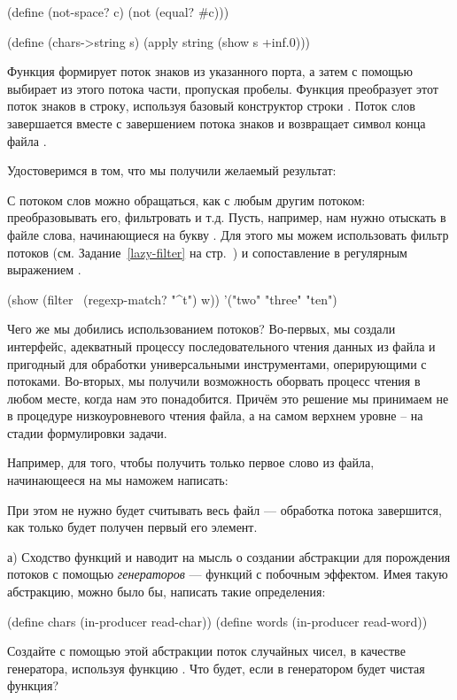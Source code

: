 {\begin{Definition}[emph={p,ch,s,c}]
(define (not-space? c) (not (equal? #\space c)))

(define (chars->string s) 
  (apply string (show s +inf.0)))
\end{Definition}
\noindent
Функция  формирует поток знаков из указанного порта, а затем с помощью  выбирает из этого потока части, пропуская пробелы. Функция  преобразует этот поток знаков в строку, используя базовый конструктор строки . Поток слов завершается вместе с завершением потока знаков и возвращает символ конца файла .

Удостоверимся в том, что мы получили желаемый результат:

С потоком слов можно обращаться, как с любым другим потоком: преобразовывать его, фильтровать и т.д. Пусть, например, нам нужно отыскать в файле слова, начинающиеся на букву . Для этого мы можем использовать фильтр потоков  (см. Задание~\ref{lazy-filter} на стр.~\pageref{lazy-filter}) и сопоставление в регулярным выражением .

\REPL
 {(show (filter~ (regexp-match? "^t") w))}
 {'("two" "three" "ten")}

Чего же мы добились использованием потоков? Во-первых, мы создали интерфейс, адекватный процессу последовательного чтения данных из файла и пригодный для обработки универсальными инструментами, оперирующими с потоками.
Во-вторых, мы получили возможность оборвать процесс чтения в любом месте, когда нам это понадобится. Причём это решение мы принимаем не в процедуре низкоуровневого чтения файла, а на самом верхнем уровне – на стадии формулировки задачи. 

Например, для того, чтобы получить только первое слово из файла, начинающееся на  мы наможем написать:

\noindent
При этом не нужно будет считывать весь файл --- обработка потока завершится, как только будет получен первый его элемент.

\begin{Assignment}
а) Сходство функций  и  наводит на мысль о создании абстракции для порождения потоков с помощью \emph{генераторов} --- функций с побочным эффектом. Имея такую абстракцию, можно было бы, написать такие определения:
\begin{SchemeCode}
(define chars (in-producer read-char))
(define words (in-producer read-word))
\end{SchemeCode}
Создайте с помощью этой абстракции поток случайных чисел, в качестве генератора, используя функцию . Что будет, если в генератором будет чистая функция?
\end{Assignment}


}
